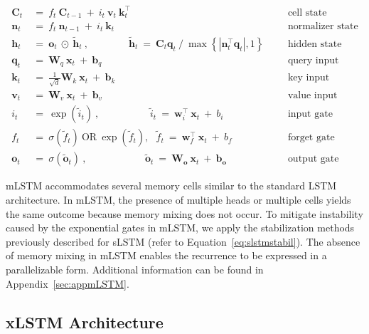 \begin{align}
\label{eq:mlstm_recurrent_begin}
\mathbf{C}_t \ &= \  f_t \ \mathbf{C}_{t-1} \ + \ 
  i_t \ \mathbf{v}_t \ \mathbf{k}_t^\top & &  &\text{cell state} \\
\mathbf{n}_t \ &= \  f_t \ \mathbf{n}_{t-1} \ + \ 
  i_t \ \mathbf{k}_t & &  &\text{normalizer state} \\
\mathbf{h}_t  \ &= \ \mathbf{o}_t \ \odot \ \tilde{\mathbf{h}}_t
\ , \qquad \qquad 
\tilde{\mathbf{h}}_t \ = \   \mathbf{C}_t \mathbf{q}_t \ / \ 
  \max \left\{ |\mathbf{n}_t^\top \mathbf{q}_t|, 1 \right\} 
   &&&\text{hidden state} \\
\mathbf{q}_t \ &= \ \mathbf{W}_q \ \mathbf{x}_t \ + \ \mathbf{b}_q  & &  &\text{query input} \\
\mathbf{k}_t \ &= \ \frac{1}{\sqrt{d}} \mathbf{W}_k \ \mathbf{x}_t \ + \ \mathbf{b}_k  & &  &\text{key input} \\
\mathbf{v}_t \ &= \ \mathbf{W}_v \ \mathbf{x}_t \ + \ \mathbf{b}_v  & &  &\text{value input} \\
i_t \ &= \ \!\exp \!  \! \left( \tilde{i}_t  \right) \ , 
 \qquad \qquad \ \ \ \ \,
  \tilde{i}_t \ = \ \mathbf{w}^\top_{i} \ \mathbf{x}_t \ + \  b_{i} \ \ \ 
  &&&\text{input gate} \\
f_t \ &= \ \sigma \!  \left(  \tilde{f}_t \right) \ \text{OR} \ \!\exp \!  \! \left(  \tilde{f}_t \right) , \ \ \: \!
\tilde{f}_t \ = \ \mathbf{w}^\top_{f} \ \mathbf{x}_t  \ + \
  b_{f}
  &&& \text{forget gate} \\
\label{eq:mlstm_recurrent_end}
\mathbf{o}_t \ &= \ \sigma \left( \tilde{\mathbf{o}}_t \right) \ , \qquad \qquad \quad \ \ \ \,
  \tilde{\mathbf{o}}_t  \ = \ \mathbf{W}_{\mathbf{o}} \ \mathbf{x}_t \ + \
  \mathbf{b}_{\mathbf{o}}
  &&&\text{output gate} 
\end{align}

mLSTM accommodates several memory cells similar to the standard LSTM architecture. In mLSTM, the presence of multiple heads or multiple cells yields the same outcome because memory mixing does not occur. To mitigate instability caused by the exponential gates in mLSTM, we apply the stabilization methods previously described for sLSTM (refer to Equation~\ref{eq:slstmstabil}). The absence of memory mixing in mLSTM enables the recurrence to be expressed in a parallelizable form. Additional information can be found in Appendix~\ref{sec:appmLSTM}.

\subsection{xLSTM Architecture}
\label{sec:xLSTMarch}

